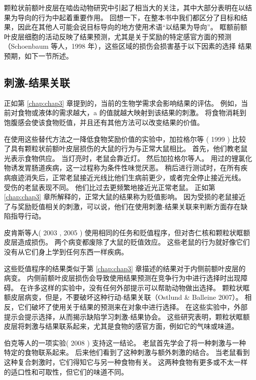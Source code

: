 颗粒状前额叶皮层在啮齿动物研究中引起了相当大的关注，其中大部分表明在以结果为导向的行为中起着重要作用。
回想一下，在整本书中我们都区分了目标和结果，因此在其他人可能会说目标导向的地方使用术语“以结果为导向”。
眶额前额叶皮层细胞的活动反映了结果预测，尤其是关于奖励的特定感官方面的预测（Schoenbaum 等人，1998 年），这些区域的损伤会损害基于以下因素的选择
结果预期，如下一节所述。



\subsection{刺激-结果关联}

正如第 \ref{chap:chap3} 章提到的，当前的生物学需求会影响结果的评估。
例如，当前对食物或液体的需求越大，a 的值就越大映射到该结果的刺激。
将食物消耗到饱腹感会使该食物贬值，并且还有其他方法可以改变结果的价值。\par


在使用这些替代方法之一降低食物奖励价值的实验中，加拉格尔等 ( 1999 ) 比较了具有颗粒状前额叶皮层损伤的大鼠的行为与正常大鼠相比。
首先，他们教老鼠光表示食物供应。
当灯亮时，老鼠会靠近灯。
然后加拉格尔等人。
用过的锂氯化物诱发胃肠道疾病，这一过程称为条件性味觉厌恶。
稍后进行测试时，在所有疾病痕迹消失后，正常老鼠接近光线比他们生病前更少，或者完全停止接近光线。
受伤的老鼠表现不同。
他们比过去更频繁地接近光正常老鼠。
正如第 \ref{chap:chap3} 章所解释的，正常大鼠的结果称为贬值影响。
因为受损的老鼠接近了与奖励贬值相关的刺激，可以说，他们在使用刺激-结果关联来判断方面存在缺陷指导行动。\par


皮肯斯等人( 2003 , 2005 ) 使用相同的任务和贬值程序，但对杏仁核和颗粒状眶额皮层造成损伤。
两个病变都废除了大鼠的贬值效应。
这些老鼠的行为就好像它们没有从它们身上学到任何东西一样疾病。\par


这些贬值程序的结果类似于第 \ref{chap:chap3} 章描述的结果对于内侧前额叶皮层的病变。
内侧前额叶皮层损伤会导致使用结果预测在竞争行为中进行选择时出现障碍。
在许多这样的实验中，没有任何外部提示可以帮助动物做出选择。
颗粒状眶额皮层病变，但是，不要破坏这种行动-结果关联（Ostlund \& Balleine 2007）。
相反，它们破坏了使用关于结果的预测来在对象中进行选择。
在这些实验中，外部提示会提示选择，从而揭示缺陷学习刺激-结果协会。
这些研究表明，颗粒状眶额皮层将刺激与结果联系起来，尤其是食物的感官方面，例如它的气味或味道。\par


伯克等人的一项实验( 2008 ) 支持这一结论。
老鼠首先学会了将一种刺激与一种特定的食物联系起来。 后来他们看到了这种刺激与额外刺激的结合。
当老鼠看到这种复合刺激时，它们得知它与另一种食物有关。
这两种食物有更多或不太一样的适口性和可取性，但它们的味道不同。\par


